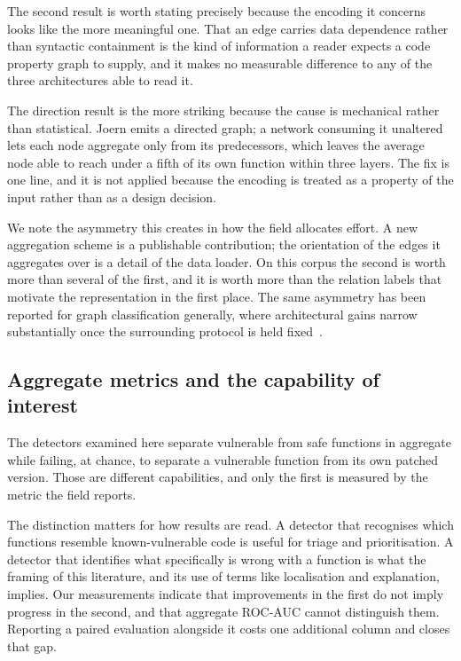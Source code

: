 The second result is worth stating precisely because the encoding it concerns
looks like the more meaningful one. That an edge carries data dependence rather
than syntactic containment is the kind of information a reader expects a code
property graph to supply, and it makes no measurable difference to any of the
three architectures able to read it.

The direction result is the more striking because the cause is mechanical rather
than statistical. Joern emits a directed graph; a network consuming it unaltered
lets each node aggregate only from its predecessors, which leaves the average
node able to reach under a fifth of its own function within three layers. The
fix is one line, and it is not applied because the encoding is treated as a
property of the input rather than as a design decision.

We note the asymmetry this creates in how the field allocates effort. A new
aggregation scheme is a publishable contribution; the orientation of the edges it
aggregates over is a detail of the data loader. On this corpus the second is
worth more than several of the first, and it is worth more than the relation
labels that motivate the representation in the first place. The same asymmetry has been reported for
graph classification generally, where architectural gains narrow substantially
once the surrounding protocol is held fixed~\citep{errica2020fair}.

\subsection{Aggregate metrics and the capability of interest}
The detectors examined here separate vulnerable from safe functions in aggregate
while failing, at chance, to separate a vulnerable function from its own patched
version. Those are different capabilities, and only the first is measured by the
metric the field reports.

The distinction matters for how results are read. A detector that recognises
which functions resemble known-vulnerable code is useful for triage and
prioritisation. A detector that identifies what specifically is wrong with a
function is what the framing of this literature, and its use of terms like
localisation and explanation, implies. Our measurements indicate that
improvements in the first do not imply progress in the second, and that
aggregate ROC-AUC cannot distinguish them. Reporting a paired evaluation
alongside it costs one additional column and closes that gap.

